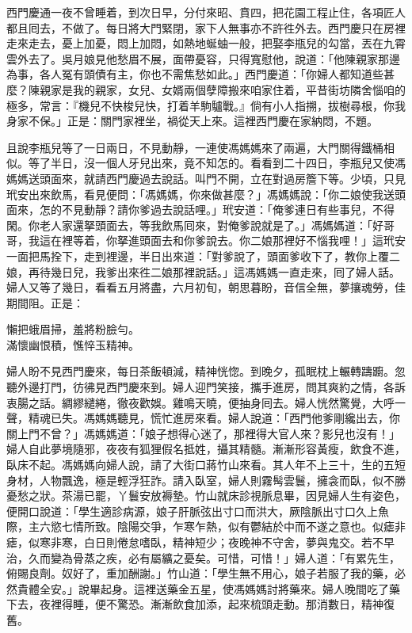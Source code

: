 西門慶通一夜不曾睡着，到次日早，分付來昭、賁四，把花園工程止住，各項匠人都且囘去，不做了。每日將大門緊閉，家下人無事亦不許徃外去。西門慶只在房裡走來走去，憂上加憂，悶上加悶，如熱地蜒蚰一般，把娶李瓶兒的勾當，丟在九霄雲外去了。吳月娘見他愁眉不展，面帶憂容，只得寬慰他，說道：「他陳親家那邊為事，各人冤有頭債有主，你也不需焦愁如此。」西門慶道：「你婦人都知道些甚麼？陳親家是我的親家，女兒、女婿兩個孽障搬來咱家住着，平昔街坊隣舍惱咱的極多，常言：『機兒不快梭兒快，打着羊駒驢戰。』倘有小人指搠，拔樹尋根，你我身家不保。」{}正是：關門家裡坐，禍從天上來。這裡西門慶在家納悶，不題。

且說李瓶兒等了一日兩日，不見動靜，一連使馮媽媽來了兩遍，大門關得鐵桶相似。等了半日，沒一個人牙兒出來，竟不知怎的。看看到二十四日，李瓶兒又使馮媽媽送頭面來，就請西門慶過去說話。叫門不開，立在對過房簷下等。少頃，只見玳安出來飲馬，看見便問：「馮媽媽，你來做甚麼？」馮媽媽說：「你二娘使我送頭面來，怎的不見動靜？請你爹過去說話哩。」玳安道：「俺爹連日有些事兒，不得閑。你老人家還拏頭面去，等我飲馬囘來，對俺爹說就是了。」馮媽媽道：「好哥哥，我這在裡等着，你拏進頭面去和你爹說去。你二娘那裡好不惱我哩！」這玳安一面把馬拴下，走到裡邊，半日出來道：「對爹說了，頭面爹收下了，教你上覆二娘，再待幾日兒，我爹出來徃二娘那裡說話。」這馮媽媽一直走來，囘了婦人話。婦人又等了幾日，看看五月將盡，六月初旬，朝思暮盼，音信全無，夢攘魂勞，佳期間阻。正是：

\begin{myquote}
懶把蛾眉掃，羞將粉臉勻。\\滿懷幽恨積，憔悴玉精神。
\end{myquote}

婦人盼不見西門慶來，每日茶飯頓減，精神恍惚。到晚夕，孤眠枕上輾轉躊躕。忽聽外邊打門，彷彿見西門慶來到。婦人迎門笑接，攜手進房，問其爽約之情，各訴衷腸之話。綢繆繾綣，徹夜歡娛。雞鳴天曉，便抽身囘去。婦人恍然驚覺，大呼一聲，精魂已失。馮媽媽聽見，慌忙進房來看。婦人說道：「西門他爹剛纔出去，你關上門不曾？」馮媽媽道：「娘子想得心迷了，那裡得大官人來？影兒也沒有！」婦人自此夢境隨邪，夜夜有狐狸假名抵姓，攝其精髓。漸漸形容黃瘦，飲食不進，臥床不起。馮媽媽向婦人說，請了大街口蔣竹山來看。其人年不上三十，生的五短身材，人物飄逸，極是輕浮狂詐。請入臥室，婦人則霧髩雲鬟，{}擁衾而臥，{}似不勝憂愁之狀。茶湯已罷，丫鬟安放褥墊。竹山就床診視脈息畢，因見婦人生有姿色，{}便開口說道：「學生適診病源，娘子肝脈弦出寸口而洪大，厥陰脈出寸口久上魚際，主六慾七情所致。陰陽交爭，乍寒乍熱，似有鬱結於中而不遂之意也。似瘧非瘧，似寒非寒，白日則倦怠嗜臥，精神短少；夜晚神不守舍，夢與鬼交。若不早治，久而變為骨蒸之疾，必有屬纊之憂矣。可惜，可惜！」婦人道：「有累先生，俯賜良劑。奴好了，重加酬謝。」竹山道：「學生無不用心，娘子若服了我的藥，必然貴體全安。」說畢起身。這裡送藥金五星，使馮媽媽討將藥來。婦人晚間吃了藥下去，夜裡得睡，便不驚恐。漸漸飲食加添，起來梳頭走動。那消數日，精神復舊。{}

